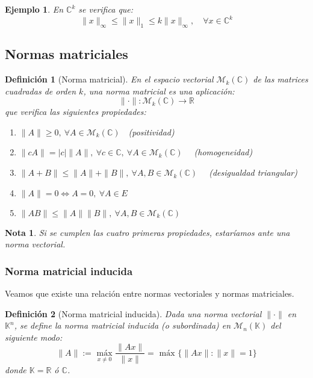 \documentclass[11pt, a4paper]{article}
\newif\IfInSansMode
\numberwithin{equation}{section}
\theoremstyle{theorem-style}
\theoremstyle{definition-style}
\newtheorem{ndef}{Definición}[section]
\theoremstyle{remark-style}
\newtheorem*{nota}{Nota}
\theoremstyle{example-style}
\newtheorem{ejemplo}{Ejemplo}[section]
\newenvironment{nlist}
{\begin{enumerate}
    \renewcommand\labelenumi{(\emph{\roman{enumi})}}}
  {\end{enumerate}}
\begin{document}
\begin{ejemplo} En $\mathbb{C}^k$ se verifica que: $$\|x\|_\infty \le \|x\|_1 \le k\|x\|_\infty,\quad \forall x \in \mathbb{C}^k$$
	
\end{ejemplo}

\subsection{Normas matriciales}
\label{sub:normas_matriciales}

\begin{ndef}[Norma matricial]
    En el espacio vectorial $\mathcal M_k(\mathbb C)$ de las matrices cuadradas de orden $k$, una norma matricial es una aplicación: $$\|\cdot\| : \mathcal M_k (\mathbb C) \longrightarrow \mathbb R$$ que verifica las siguientes propiedades:
    \begin{nlist}
		\item $\|A\| \ge 0, \ \forall A \in \mathcal M_k(\mathbb{C})\quad$(positividad)
	\item $\|cA\| = |c|\|A\|, \ \forall c \in \mathbb{C},\ \forall A \in \mathcal M_k(\mathbb{C})\quad$ (homogeneidad)
	\item $\|A + B \| \le \|A\| + \|B\|, \ \forall A,B \in \mathcal M_k(\mathbb{C})\quad$ (desigualdad triangular)
	\item $\|A\| = 0 \iff A = 0,\ \forall A \in E$
	\item $\|A B \| \le \|A\| \|B\|, \ \forall A,B \in \mathcal M_k(\mathbb{C})$
\end{nlist}
\end{ndef}
\begin{nota}
	Si se cumplen las cuatro primeras propiedades, estaríamos ante una norma vectorial.
\end{nota}

\subsubsection{Norma matricial inducida}
\label{ssub:norma_matricial_inducida}

Veamos que existe una relación entre normas vectoriales y normas matriciales.

\begin{ndef}[Norma matricial inducida]
    Dada una norma vectorial $\|\cdot\|$ en $\mathbb{K}^n$, se define la \textit{norma matricial inducida} (o subordinada) en $\mathcal M_n(\mathbb K)$ del siguiente modo: $$\|A\| := \underset{x\ne 0}{\text{ máx }} \frac{\|Ax\|}{\|x\|} = \text{ máx } \{ \|Ax\| : \|x\| = 1 \}$$ donde $\mathbb K = \mathbb{R}$ ó $\mathbb{C}$.
\end{ndef}
\end{document}
